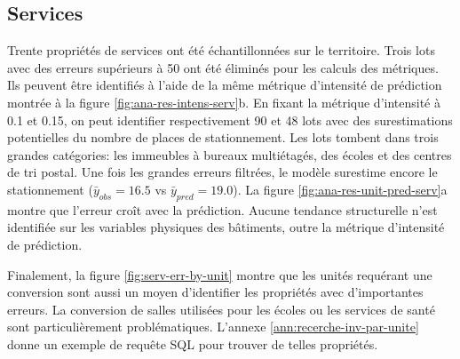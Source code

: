 \subsection{Services}
Trente propriétés de services ont été échantillonnées sur le territoire. Trois lots avec des erreurs supérieurs à 50 ont été éliminés pour les calculs des métriques. Ils peuvent être identifiés à l'aide de la même métrique d'intensité de prédiction montrée à la figure \ref{fig:ana-res-intens-serv}b. En fixant la métrique d'intensité à 0.1 et 0.15, on peut identifier respectivement 90 et 48 lots avec des surestimations potentielles du nombre de places de stationnement. Les lots tombent dans trois grandes catégories: les immeubles à bureaux multiétagés, des écoles et des centres de tri postal. Une fois les grandes erreurs filtrées, le modèle surestime encore le stationnement ($\bar{y}_{obs} = 16.5$ vs $\bar{y}_{pred} =19.0$). La figure \ref{fig:ana-res-unit-pred-serv}a montre que l'erreur croît avec la prédiction. Aucune tendance structurelle n'est identifiée sur les variables physiques des bâtiments, outre la métrique d'intensité de prédiction. \par
Finalement, la figure \ref{fig:serv-err-by-unit} montre que les unités requérant une conversion sont aussi un moyen d'identifier les propriétés avec d'importantes erreurs. La conversion de salles utilisées pour les écoles ou les services de santé sont particulièrement problématiques. L'annexe \ref{ann:recerche-inv-par-unite} donne un exemple de requête SQL pour trouver de telles propriétés.

